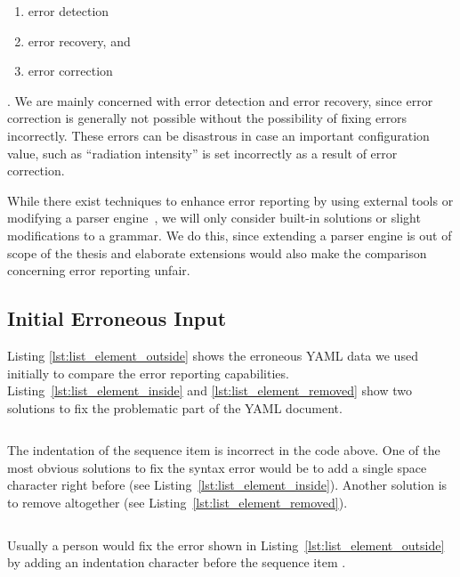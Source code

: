 \begin{enumerate}
  \item error detection
  \item error recovery, and
  \item error correction
\end{enumerate}

. We are mainly concerned with error detection and error recovery, since error correction is generally not possible without the possibility of fixing errors incorrectly. These errors can be disastrous in case an important configuration value, such as “radiation intensity” is set incorrectly as a result of error correction.

While there exist techniques to enhance error reporting by using external tools or modifying a parser engine~\cite{jeffery2003generating, cox2010errors}, we will only consider built-in solutions or slight modifications to a grammar. We do this, since extending a parser engine is out of scope of the thesis and elaborate extensions would also make the comparison concerning error reporting unfair.

\subsection{Initial Erroneous Input}

Listing \ref{lst:list_element_outside} shows the erroneous YAML data we used initially to compare the error reporting capabilities. Listing~\ref{lst:list_element_inside} and \ref{lst:list_element_removed} show two solutions to fix the problematic part of the YAML document.

\begin{listing}
  \begin{code-boxed}
    \inputminted[linenos]{yaml}{Data/Errors/list_element_outside.yaml}
  \end{code-boxed}
  \caption{The indentation of the sequence item  is incorrect in the code above. One of the most obvious solutions to fix the syntax error would be to add a single space character right before  (see Listing~\ref{lst:list_element_inside}). Another solution is to remove  altogether (see Listing~\ref{lst:list_element_removed}).}
  \label{lst:list_element_outside}
\end{listing}

\begin{listing}
  \begin{code-boxed}
    \inputminted[linenos]{yaml}{Data/Correct/list_element_inside.yaml}
  \end{code-boxed}
  \caption{Usually a person would fix the error shown in Listing~\ref{lst:list_element_outside} by adding an indentation character before the sequence item .}
  \label{lst:list_element_inside}
\end{listing}

